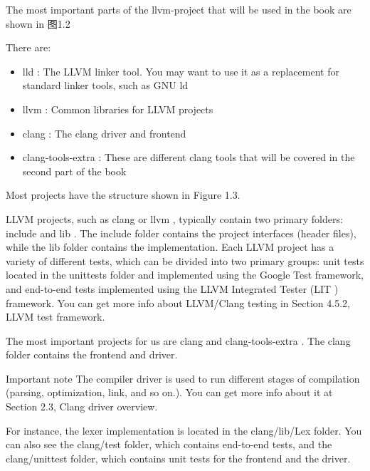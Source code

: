 The most important parts of the llvm-project that will be used in the book are shown in 图1.2


There are:

\begin{itemize}
\item
lld : The LLVM linker tool. You may want to use it as a replacement for standard linker tools, such as GNU ld

\item
llvm : Common libraries for LLVM projects

\item
clang : The clang driver and frontend

\item
clang-tools-extra : These are different clang tools that will be covered in the second part of the book
\end{itemize}

Most projects have the structure shown in Figure 1.3.


LLVM projects, such as clang or llvm , typically contain two primary folders: include and lib . The include folder contains the project interfaces (header files), while the lib folder contains the implementation. Each LLVM project has a variety of different tests, which can be divided into two primary groups: unit tests located in the unittests folder and implemented using the Google Test framework, and end-to-end tests implemented using the LLVM Integrated Tester (LIT ) framework. You can get more info about LLVM/Clang testing in Section 4.5.2, LLVM test framework.

The most important projects for us are clang and clang-tools-extra . The clang folder contains the frontend and driver.

\begin{myNotic}{Important note}
The compiler driver is used to run different stages of compilation (parsing, optimization, link, and so on.). You can get more info about it at Section 2.3, Clang driver overview.
\end{myNotic}


For instance, the lexer implementation is located in the clang/lib/Lex folder. You can also see the clang/test folder, which contains end-to-end tests, and the clang/unittest folder, which contains unit tests for the frontend and the driver.

